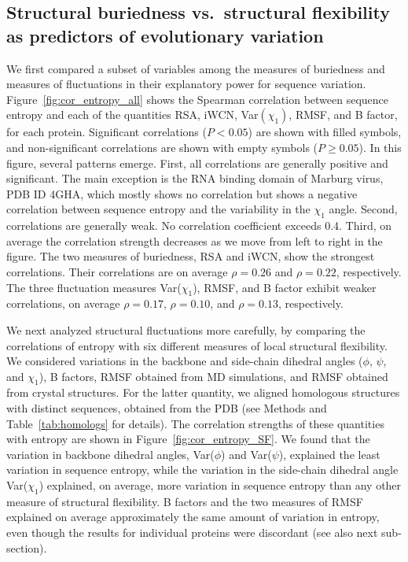 \documentclass[12pt]{article}
\begin{document}
\subsection*{Structural buriedness vs.\ structural flexibility as predictors of evolutionary variation}

We first compared a subset of variables among the measures of buriedness and measures of fluctuations in their explanatory power for sequence variation. Figure~\ref{fig:cor_entropy_all} shows the Spearman correlation between sequence entropy and each of the quantities RSA, iWCN, Var$(\chi_1)$, RMSF, and B factor, for each protein. Significant correlations ($P<0.05$) are shown with filled symbols, and non-significant correlations are shown with empty symbols ($P\geq0.05$).
In this figure, several patterns emerge. First, all correlations are generally positive and significant. The main exception is the RNA binding domain of Marburg virus, PDB ID 4GHA, which mostly shows no correlation but shows a negative correlation between sequence entropy and the variability in the $\chi_1$ angle. Second, correlations are generally weak. No correlation coefficient exceeds 0.4. Third, on average the correlation strength decreases as we move from left to right in the figure. The two measures of buriedness, RSA and iWCN, show the strongest correlations. Their correlations are on average $\rho=0.26$ and $\rho=0.22$, respectively. The three fluctuation measures Var($\chi_1$), RMSF, and B factor exhibit weaker correlations, on average $\rho=0.17$, $\rho=0.10$, and $\rho=0.13$, respectively.

We next analyzed structural fluctuations more carefully, by comparing the correlations of entropy with six different measures of local structural flexibility.  We considered variations in the backbone and side-chain dihedral angles ($\phi$, $\psi$, and $\chi_1$), B factors, RMSF obtained from MD simulations, and RMSF obtained from crystal structures. For the latter quantity, we aligned homologous structures with distinct sequences, obtained from the PDB (see Methods and Table~\ref{tab:homologs} for details). The correlation strengths of these quantities with entropy are shown in Figure~\ref{fig:cor_entropy_SF}. We found that the variation in backbone dihedral angles, Var($\phi$) and Var($\psi$), explained the least variation in sequence entropy, while the variation in the side-chain dihedral angle Var($\chi_1$) explained, on average, more variation in sequence entropy than any other measure of structural flexibility. B factors and the two measures of RMSF explained on average approximately the same amount of variation in entropy, even though the results for individual proteins were discordant (see also next sub-section).
\end{document}
